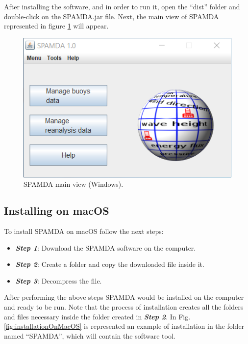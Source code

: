 \begin{onehalfspace}
				After installing the software, and in order to run it, open the ``dist'' folder and double-click on the SPAMDA.jar file. Next, the main view of SPAMDA represented in figure \ref{fig:SPAMDAmainViewonWindows} will appear.
				
				\begin{figure}[ht!]
					\centering
					\includegraphics[scale=0.80]{figures/mainViewonWindows.png}
					\caption{SPAMDA main view (Windows).}
					\label{fig:SPAMDAmainViewonWindows}
				\end{figure}

			
			\subsection{Installing on macOS}
			
				To install SPAMDA on macOS follow the next steps:
			
					\begin{itemize}
						\item \textit{\textbf{Step 1}}: Download the SPAMDA software on the computer.
						\item \textit{\textbf{Step 2}}: Create a folder and copy the downloaded file inside it.
						\item \textit{\textbf{Step 3}}: Decompress the file.
					\end{itemize}
					
				After performing the above steps SPAMDA would be installed on the computer and ready to be run. Note that the process of installation creates all the folders and files necessary inside the folder created in \textit{\textbf{Step 2}}. In Fig. \ref{fig:installationOnMacOS} is represented an example of installation in the folder named ``SPAMDA'', which will contain the software tool.
				

\end{onehalfspace}
